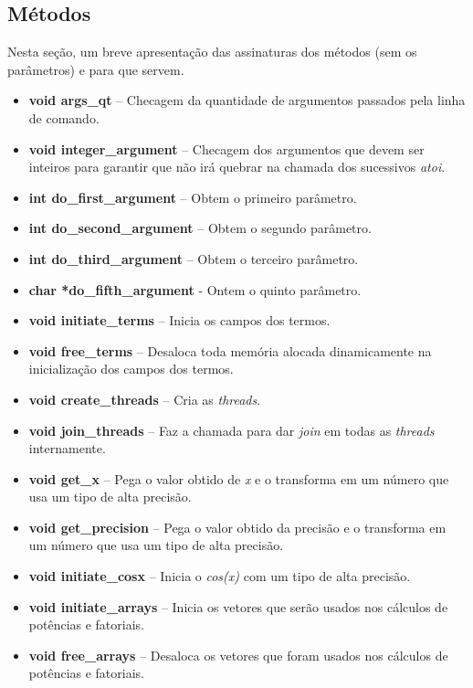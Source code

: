 \documentclass[11pt]{article}
\begin{document}
\subsection{Métodos}
Nesta seção, um breve apresentação das assinaturas dos métodos (sem os parâmetros) e para que servem.
\begin{itemize}
	\item \textbf{\textcolor{sblue}{void} args\_qt} -- Checagem da quantidade de argumentos passados pela linha de comando.
	\item \textbf{\textcolor{sblue}{void} integer\_argument} -- Checagem dos argumentos que devem ser inteiros para garantir que não irá quebrar na chamada dos sucessivos \textit{atoi}.
	\item \textbf{\textcolor{sblue}{int} do\_first\_argument} -- Obtem o primeiro parâmetro.
	\item \textbf{\textcolor{sblue}{int} do\_second\_argument} -- Obtem o segundo parâmetro.
	\item \textbf{\textcolor{sblue}{int} do\_third\_argument} -- Obtem o terceiro parâmetro.
	\item \textbf{\textcolor{sblue}{char} *do\_fifth\_argument} - Ontem o quinto parâmetro.
	\item \textbf{\textcolor{sblue}{void} initiate\_terms} -- Inicia os campos dos termos.
	\item \textbf{\textcolor{sblue}{void} free\_terms} -- Desaloca toda memória alocada dinamicamente na inicialização dos campos dos termos.
	\item \textbf{\textcolor{sblue}{void} create\_threads} -- Cria as \textit{threads}.
	\item \textbf{\textcolor{sblue}{void} join\_threads} -- Faz a chamada para dar \textit{join} em todas as \textit{threads} internamente.
	\item \textbf{\textcolor{sblue}{void} get\_x} -- Pega o valor obtido de \textit{x} e o transforma em um número que usa um tipo de alta precisão.
	\item \textbf{\textcolor{sblue}{void} get\_precision} -- Pega o valor obtido da precisão e o transforma em um número que usa um tipo de alta precisão.
	\item \textbf{\textcolor{sblue}{void} initiate\_cosx} -- Inicia o \textit{cos(x)} com um tipo de alta precisão.
	\item \textbf{\textcolor{sblue}{void} initiate\_arrays} -- Inicia os vetores que serão usados nos cálculos de potências e fatoriais.
	\item \textbf{\textcolor{sblue}{void} free\_arrays} -- Desaloca os vetores que foram usados nos cálculos de potências e fatoriais.

\end{itemize}
\end{document}
